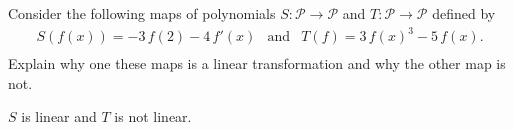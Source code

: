 
\begin{exerciseStatement}


Consider the following maps of polynomials \(S:\mathcal{P}\rightarrow\mathcal{P}\) and \(T:\mathcal{P}\rightarrow\mathcal{P}\) defined by 
\begin{align*} S(f(x))= -3 \, f\left(2\right) - 4 \, f'\left(x\right)  & \text{and} & T(f)= 3 \, f\left(x\right)^{3} - 5 \, f\left(x\right) . \\ \end{align*}
             Explain why one these maps is a linear transformation and why the other map is not. 


\end{exerciseStatement}
    
\begin{exerciseAnswer} 


\(S\) is linear and \(T\) is not linear.


\end{exerciseAnswer}
    
